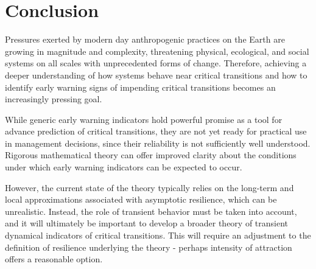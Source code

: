 \section{Conclusion}
\label{sec:conclusion}








Pressures exerted by modern day anthropogenic practices on the Earth are growing in magnitude and complexity, threatening physical, ecological, and social systems on all scales with unprecedented forms of change. Therefore, achieving a deeper understanding of how systems behave near critical transitions and how to identify early warning signs of impending critical transitions becomes an increasingly pressing goal. 

While generic early warning indicators hold powerful promise as a tool for advance prediction of critical transitions, they are not yet ready for practical use in management decisions, since their reliability is not sufficiently well understood. Rigorous mathematical theory can offer improved clarity about the conditions under which early warning indicators can be expected to occur. 

However, the current state of the theory typically relies on the long-term and local approximations associated with asymptotic resilience, which can be unrealistic. Instead, the role of transient behavior must be taken into account, and it will ultimately be important to develop a broader theory of transient dynamical indicators of critical transitions. 
This will require an adjustment to the definition of resilience underlying the theory - perhaps intensity of attraction offers a reasonable option. 